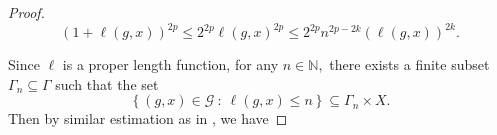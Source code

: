 \documentclass[a4paper,11pt,reqno]{amsart}
\theoremstyle{plain}
\theoremstyle{named}
\numberwithin{equation}{section}
\newcommand{\Bea}{\begin{eqnarray*}}
\newcommand{\Eea}{\end{eqnarray*}}
\begin{document}
\begin{proof}
				$$\left (1 + \ell (g, x) \right )^{2p} \leq 2^{2p} \ell (g, x)^{2p} \leq 2^{2p} n^{2p - 2k} \left (\ell (g, x) \right )^{2k}.$$
				
				Since $\ell$ is a proper length function, for any $n \in \mathbb N,$ there exists a finite subset $\Gamma_n \subseteq \Gamma$ such that the set 
				$$\left \{(g, x) \in \mathcal G\ :\ \ell (g, x) \leq n \right \} \subseteq \Gamma_n \times X.$$
				Then by similar estimation as in \cite[Lemma 3.3]{Long-Wu-2017-Twisted-group-C-alg-as-CQMS}, we have
				
				

\end{proof}
\end{document}
